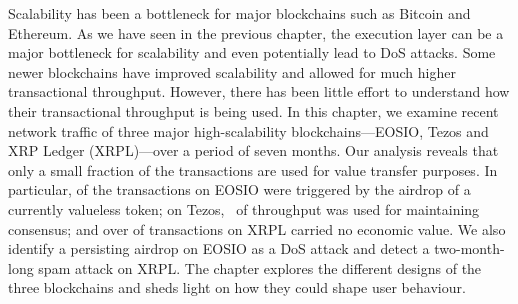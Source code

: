 Scalability has been a bottleneck for major blockchains such as Bitcoin and Ethereum.
As we have seen in the previous chapter, the execution layer can be a major bottleneck for scalability and even potentially lead to DoS attacks.
Some newer blockchains have improved scalability and allowed for much higher transactional throughput.
However, there has been little effort to understand how their transactional throughput is being used.
In this chapter, we examine recent network traffic of three major high-scalability blockchains---EOSIO, Tezos and XRP Ledger (XRPL)---over a period of seven months.
Our analysis reveals that only a small fraction of the transactions are used for value transfer purposes. In particular,  of the transactions on EOSIO were triggered by the airdrop of a currently valueless token; on Tezos,~ of throughput was used for maintaining consensus; and over  of transactions on XRPL carried no economic value. We also identify a persisting airdrop on EOSIO as a DoS attack and detect a two-month-long spam attack on XRPL.
The chapter explores the different designs of the three blockchains and sheds light on how they could shape user behaviour.
